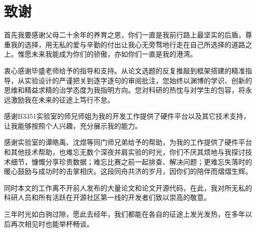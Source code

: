 \chapter{致\texorpdfstring{\quad}{}谢}

首先我要感谢父母二十余年的养育之恩，你们一直是我前行路上最坚实的后盾，尊重我的选择，用无私的爱与辛勤的付出让我心无旁骛地行走在自己所选择的道路之上。惟愿未来我能成为你们的骄傲，亦如你们一直是我的港湾。

衷心感谢毕盛老师给予的指导和支持。从论文选题的反复推敲到框架搭建的精准指导，从实验设计的严谨把关到逐字逐句的审阅批注，您始终以渊博的学识、创新的思维和精益求精的治学态度为我指明方向。您对科研的热忱与对学生的包容，将永远激励我在未来的征途上笃行不怠。

感谢B3351实验室的师兄师姐为我的开发工作提供了硬件平台以及其它技术支持，让我能够按照个人兴趣，充分展示我的能力。

感谢实验室的谭皓禹、沈煜等同门师兄弟给予的帮助，为我的工作提供了硬件平台和其他技术帮助，也难忘无数个深夜并肩实验的时光，你们不厌其烦地与我探讨技术细节，慷慨分享珍贵数据；难忘比赛之前一起排查、解决问题；更难忘失落时的暖心鼓励与成功时的击掌相庆。这段同舟共济的岁月，因你们的陪伴而熠熠生辉。

同时本文的工作离不开前人发布的大量论文和论文开源代码，在此，我对所无私的科研人员和所有活跃在开源社区第一线的开发者们致以崇高的敬意。

三年时光如白驹过隙，愿此去经年，我们都能在各自的征途上发光发热，在多年以后再次相见时也能举杯畅谈。